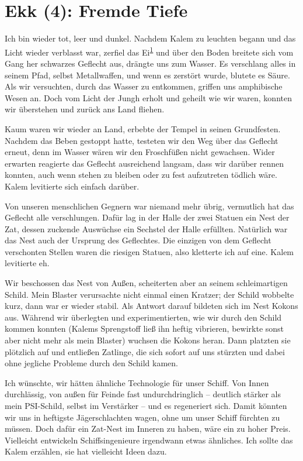 \documentclass[11pt]{scrartcl}
\begin{document}
\section{Ekk (4): Fremde Tiefe}

Ich bin wieder tot, leer und dunkel. Nachdem Kalem zu leuchten begann
und das Licht wieder verblasst war, zerfiel das
Ei\textsuperscript{\href{http://1w6.org/print/book/export/html/59\#fn:kalem-innen}{1}}
und über den Boden breitete sich vom Gang her schwarzes Geflecht aus,
drängte uns zum Wasser. Es verschlang alles in seinem Pfad, selbst
Metallwaffen, und wenn es zerstört wurde, blutete es Säure. Als wir
versuchten, durch das Wasser zu entkommen, griffen uns amphibische Wesen
an. Doch vom Licht der Jungh erholt und geheilt wie wir waren, konnten
wir überstehen und zurück ans Land fliehen.

Kaum waren wir wieder an Land, erbebte der Tempel in seinen Grundfesten.
Nachdem das Beben gestoppt hatte, testeten wir den Weg über das Geflecht
erneut, denn im Wasser wären wir den Froschfüßen nicht gewachsen. Wider
erwarten reagierte das Geflecht ausreichend langsam, dass wir darüber
rennen konnten, auch wenn stehen zu bleiben oder zu fest aufzutreten
tödlich wäre. Kalem levitierte sich einfach darüber.

Von unseren menschlichen Gegnern war niemand mehr übrig, vermutlich hat
das Geflecht alle verschlungen. Dafür lag in der Halle der zwei Statuen
ein Nest der Zat, dessen zuckende Auswüchse ein Sechstel der Halle
erfüllten. Natürlich war das Nest auch der Ursprung des Geflechtes. Die
einzigen von dem Geflecht verschonten Stellen waren die riesigen
Statuen, also kletterte ich auf eine. Kalem levitierte eh.

Wir beschossen das Nest von Außen, scheiterten aber an seinem
schleimartigen Schild. Mein Blaster verursachte nicht einmal einen
Kratzer; der Schild wobbelte kurz, dann war er wieder stabil. Als
Antwort darauf bildeten sich im Nest Kokons aus. Während wir überlegten
und experimentierten, wie wir durch den Schild kommen konnten (Kalems
Sprengstoff ließ ihn heftig vibrieren, bewirkte sonst aber nicht mehr
als mein Blaster) wuchsen die Kokons heran. Dann platzten sie plötzlich
auf und entließen Zatlinge, die sich sofort auf uns stürzten und dabei
ohne jegliche Probleme durch den Schild kamen.

Ich wünschte, wir hätten ähnliche Technologie für unser Schiff. Von
Innen durchlässig, von außen für Feinde fast undurchdringlich --
deutlich stärker als mein PSI-Schild, selbst im Verstärker -- und es
regeneriert sich. Damit könnten wir uns in heftigste Jägerschlachten
wagen, ohne um unser Schiff fürchten zu müssen. Doch dafür ein Zat-Nest
im Inneren zu haben, wäre ein zu hoher Preis. Vielleicht entwickeln
Schiffsingenieure irgendwann etwas ähnliches. Ich sollte das Kalem
erzählen, sie hat vielleicht Ideen dazu.
\end{document}
